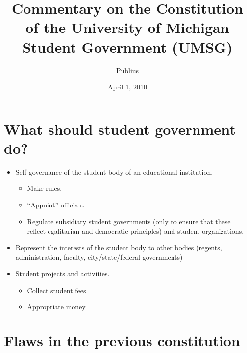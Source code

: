 \documentclass[12pt,letterpaper]{article}
\begin{document}
\title{Commentary on the Constitution of the University of Michigan Student Government (UMSG)}
\author{Publius}
\date{April 1, 2010}
\maketitle


\section*{What should student government do?}
\begin{itemize}
	\item Self-governance of the student body of an educational institution.
	\begin{itemize}
		\item Make rules.
		\item ``Appoint'' officials.
		\item Regulate subsidiary student governments (only to ensure that these reflect egalitarian and democratic principles) and student organizations.
	\end{itemize}
	\item Represent the interests of the student body to other bodies (regents, administration, faculty, city/state/federal governments)
	\item Student projects and activities.
	\begin{itemize}
		\item Collect student fees
		\item Appropriate money
	\end{itemize}
\end{itemize}


\section*{Flaws in the previous constitution}
\end{document}

